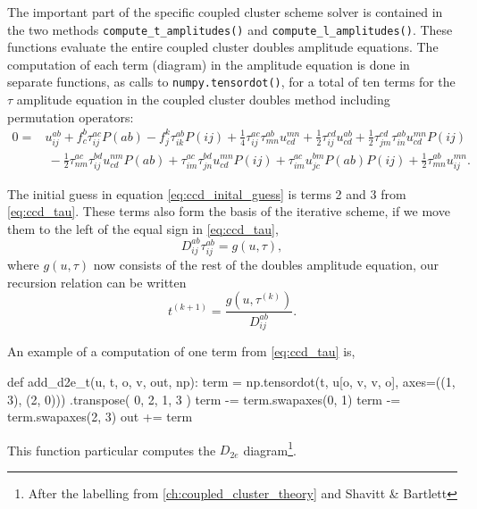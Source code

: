     The important part of the specific coupled cluster scheme solver is contained in the two 
    methods \lstinline{compute_t_amplitudes()} and \lstinline{compute_l_amplitudes()}.
    These functions evaluate the entire coupled cluster doubles amplitude equations.
    The computation of each term (diagram) in the amplitude equation is done in separate functions,
    as calls to \lstinline{numpy.tensordot()}, for a total of ten terms for the 
    $\tau$ amplitude equation in the coupled cluster doubles method including 
    permutation operators:
    \begin{equation}
        \label{eq:ccd_tau}
        \begin{aligned}
        0 =& u^{ab}_{ij} + f^b_c \tau^{ac}_{ij}P(ab) 
            - f^k_j \tau^{ab}_{ik}P(ij)
            + \frac{1}{4} \tau^{ac}_{ij} \tau^{ab}_{mn}u^{mn}_{cd} 
            + \frac{1}{2} \tau^{cd}_{ij}u^{ab}_{cd}
            + \frac{1}{2} \tau^{cd}_{jm} \tau^{ab}_{in} u^{mn}_{cd}P(ij) \\
            &\ - \frac{1}{2} \tau^{ac}_{nm} \tau^{bd}_{ij} u^{nm}_{cd}P(ab)
            + \tau^{ac}_{im} \tau^{bd}_{jn}u^{mn}_{cd}P(ij)
            + \tau^{ac}_{im}u^{bm}_{jc}P(ab)P(ij)
            + \frac{1}{2} \tau^{ab}_{mn}u^{mn}_{ij}.
        \end{aligned}
    \end{equation}

    The initial guess in equation \autoref{eq:ccd_inital_guess} is terms 2 and 3
    from \autoref{eq:ccd_tau}. These terms also form the basis of the iterative scheme,
    if we move them to the left of the equal sign in \autoref{eq:ccd_tau}, 
    \begin{equation}
        D^{ab}_{ij} \tau^{ab}_{ij} = g(u, \tau),
    \end{equation}
    where $g(u, \tau)$ now consists of the rest of the doubles amplitude equation, our 
    recursion relation can be written
    \begin{equation}
        t^{(k+1)} = \frac{g(u,\tau^{(k)})}{D^{ab}_{ij}}.
    \end{equation}

    
    \vfill
    \pagebreak

    An example of a computation of one term from \autoref{eq:ccd_tau} is,
    \begin{python}
    def add_d2e_t(u, t, o, v, out, np):
        term = np.tensordot(t, u[o, v, v, o], axes=((1, 3), (2, 0)))
            .transpose(
                0, 2, 1, 3
        )
        term -= term.swapaxes(0, 1)
        term -= term.swapaxes(2, 3)
        out += term
    \end{python}
    This function particular computes the $D_{2e}$ diagram\footnote{After the labelling from 
    \autoref{ch:coupled_cluster_theory} and Shavitt \& Bartlett\cite{shavitt2009many}}.

